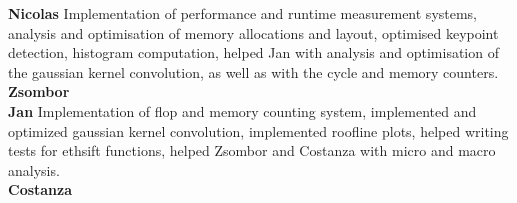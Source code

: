 \documentclass[letterpaper]{article}
\begin{document}
\textbf{Nicolas} Implementation of performance and runtime measurement systems, analysis and optimisation of memory allocations and layout, optimised keypoint detection, histogram computation, helped Jan with analysis and optimisation of the gaussian kernel convolution, as well as with the cycle and memory counters. \\

\textbf{Zsombor} \\

\textbf{Jan} Implementation of flop and memory counting system, implemented and optimized gaussian kernel convolution, implemented roofline plots, helped writing tests for ethsift functions, helped Zsombor and Costanza with micro and macro analysis. \\

\textbf{Costanza} \\


\end{document}
